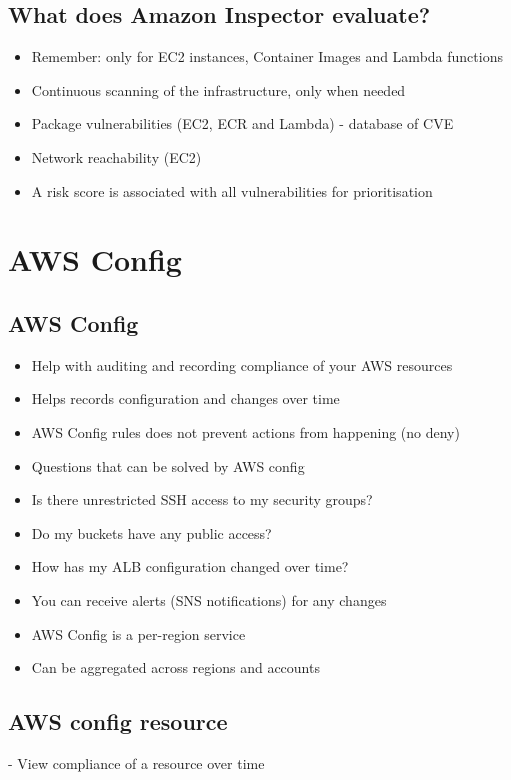 \subsection{What does Amazon Inspector evaluate?}
\begin{itemize}
    \item Remember: only for EC2 instances, Container Images and Lambda functions
    \item Continuous scanning of the infrastructure, only when needed
    \item Package vulnerabilities (EC2, ECR and Lambda) - database of CVE
    \item Network reachability (EC2)
    \item A risk score is associated with all vulnerabilities for prioritisation
\end{itemize}


\section{AWS Config}

\subsection{AWS Config}
\begin{itemize}
    \item Help with auditing and recording compliance of your AWS resources
    \item Helps records configuration and changes over time
    \item AWS Config rules does not prevent actions from happening (no deny)
    \item Questions that can be solved by AWS config
    \item Is there unrestricted SSH access to my security groups?
    \item Do my buckets have any public access?
    \item How has my ALB configuration changed over time?
    \item You can receive alerts (SNS notifications) for any changes
    \item AWS Config is a per-region service
    \item Can be aggregated across regions and accounts
\end{itemize}

\subsection{AWS config resource}
- View compliance of a resource over time

